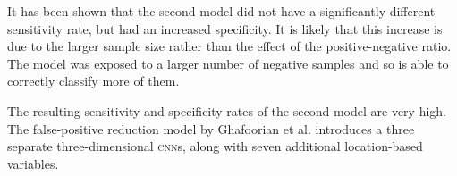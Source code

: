 It has been shown that the second model did not have a significantly different sensitivity rate, but had an increased specificity. It is likely that this increase is due to the larger sample size rather than the effect of the positive-negative ratio. The model was exposed to a larger number of negative samples and so is able to correctly classify more of them.



The resulting sensitivity and specificity rates of the second model are very high. The false-positive reduction model by Ghafoorian et al. \cite{GhafoorianM.2017Dml3} introduces a three separate three-dimensional \textsc{cnn}s, along with seven additional location-based variables. 

